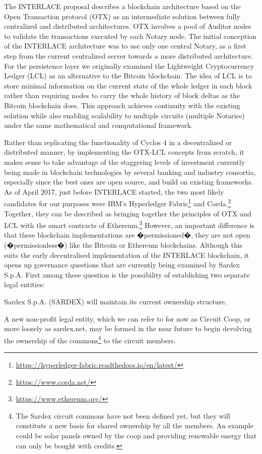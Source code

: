 The INTERLACE proposal describes a blockchain architecture based on the Open Transaction protocol (OTX) \cite{Odom} as an intermediate solution between fully centralized and distributed architectures. OTX involves a pool of Auditor nodes to validate the transactions executed by each Notary node. The initial conception of the INTERLACE architecture was to use only one central Notary, as a first step from the current centralized server towards a more distributed architecture. For the persistence layer we originally examined the Lightweight Cryptocurrency Ledger (LCL) \cite{White2015} as an alternative to the Bitcoin blockchain. The idea of LCL is to store minimal information on the current state of the whole ledger in each block rather than requiring nodes to carry the whole history of block deltas as the Bitcoin blockchain does. This approach achieves continuity with the existing solution while also enabling scalability to multiple circuits (multiple Notaries) under the same mathematical and computational framework.

Rather than replicating the functionality of Cyclos 4 in a decentralized or distributed manner, by implementing the OTX-LCL concepts from scratch, it makes sense to take advantage of the staggering levels of investment currently being made in blockchain technologies by several banking and industry consortia, especially since the best ones are open source, and build on existing frameworks. As of April 2017, just before INTERLACE started, the two most likely candidates for our purposes were IBM's Hyperledger Fabric\footnote{\url{https://hyperledger-fabric.readthedocs.io/en/latest/}}\cite{Cachin2016} and Corda.\footnote{\url{https://www.corda.net/}} Together, they can be described as bringing together the principles of OTX and LCL with the smart contracts of Ethereum.\footnote{\url{https://www.ethereum.org/}} However, an important difference is that these blockchain implementations are �permissioned�, they are not open (�permissionless�) like the Bitcoin or Ethereum blockchains. Although this suits the early decentralised implementation of the INTERLACE blockchain, it opens up governance questions that are currently being examined by Sardex S.p.A. First among these question is the possibility of establishing two separate legal entities:
\begin{packed_item1}
\item Sardex S.p.A. (SARDEX) will maintain its current ownership structure.
\item A new non-profit legal entity, which we can refer to for now as Circuit Coop, or more loosely as sardex.net, may be formed in the near future to begin devolving the ownership of the commons\footnote{The Sardex circuit commons have not been defined yet, but they will constitute a new basis for shared ownership by all the members. An example could be solar panels owned by the coop and providing renewable energy that can only be bought with credits.} to the circuit members.
\end{packed_item1}

